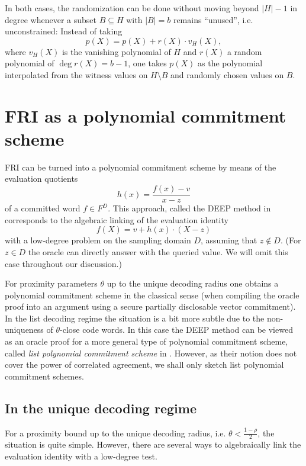 \documentclass[11pt,article,oneside]{memoir}
\theoremstyle{definition}
\theoremstyle{remark}
\begin{document}
In both cases, the randomization can be done without moving beyond $|H|-1$ in degree whenever a subset $B\subseteq H$ with $|B|=b$ remains “unused”, i.e. unconstrained: 
Instead of taking 
\[
p(X)= p(X) + r(X)\cdot v_H(X),
\]
where $v_H(X)$ is the vanishing polynomial of $H$ and $r(X)$ a random polynomial of $\deg r(X)= b - 1$, one takes $p(X)$ as the polynomial interpolated from the witness values on $H\setminus B$ and randomly chosen values on $B$.


\chapter{FRI as a polynomial commitment scheme}
\label{ch:Polycommit}

FRI can be turned into a polynomial commitment scheme by means of the evaluation quotients
\begin{equation*}
h(x)=\frac{f(x)-v}{x-z}
\end{equation*}
of a committed word $f\in F^D$. 
This approach, called the DEEP method in \cite{DEEPFRI}  corresponds to the algebraic linking of the evaluation identity
\begin{equation*}
f(X) = v + h(x)\cdot (X-z)
\end{equation*}
with a low-degree problem on the sampling domain $D$, assuming that $z\notin D$. 
(For $z\in D$ the oracle can directly answer with the queried value. We will omit this case throughout our discussion.)

For proximity parameters $\theta$ up to the unique decoding radius one obtains a polynomial commitment scheme in the classical sense (when compiling the oracle proof into an argument using a secure partially disclosable vector commitment). 
In the list decoding regime the situation is a bit more subtle due to the non-uniqueness of $\theta$-close code words. 
In this case the DEEP method can be viewed as an oracle proof for a more general type of polynomial commitment scheme, called \textit{list polynomial commitment scheme} in \cite{Redshift}. 
However, as their notion does not cover the power of correlated agreement, we shall only sketch list polynomial commitment schemes.%

\section{In the unique decoding regime}
For a proximity bound up to the unique decoding radius, i.e. $\theta < \frac{1-\rho}{2}$, the situation is quite simple. 
However, there are several ways to algebraically link the evaluation identity with a low-degree test. 
\end{document}
